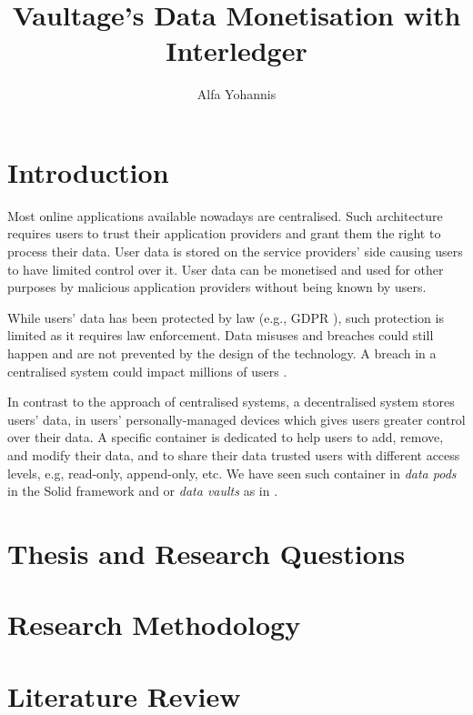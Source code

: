 \documentclass[]{report}
\title{Vaultage's Data Monetisation with Interledger}
\author{Alfa Yohannis}
\begin{document}
\maketitle

\begin{abstract}
  
\end{abstract}


\section{Introduction}
Most online applications available nowadays are centralised. Such architecture requires users to trust their application providers and grant them the right to process their data. User data is stored on the service providers' side causing users to have limited control over it. User data can be monetised and used for other purposes by malicious application providers without being known by users.

While users' data has been protected by law (e.g., GDPR \cite{GDPR}), such protection is limited as it requires law enforcement. Data misuses and breaches could still happen and are not prevented by the design of the technology. A breach in a centralised system could impact millions of users 
\cite{cambridgeanalytica,adobebreach,linkedinbreach,yahoobreach}.

In contrast to the approach of centralised systems, a decentralised system stores users' data, in users' personally-managed devices which gives users greater control over their data. A specific container is dedicated to help users to add, remove, and modify their data, and to share their data trusted users with different access levels, e.g, read-only, append-only, etc. We have seen such container in \textit{data pods} in the Solid framework \cite{solid} and or \textit{data vaults} as in \cite{mun2010datavault}.

\section{Thesis and Research Questions}

\section{Research Methodology}

\section{Literature Review}
\end{document}
